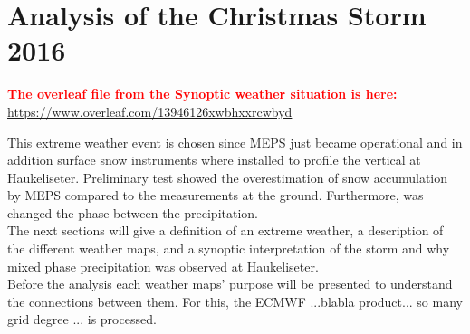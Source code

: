 \chapter{Analysis of the Christmas Storm 2016}
\textcolor{red}{\textbf{The overleaf file from the Synoptic weather situation is here:} \\
	\url{https://www.overleaf.com/13946126xwbhxxrcwbyd}}

This extreme weather event is chosen since MEPS just became operational and in addition surface snow instruments where installed to profile the vertical at Haukeliseter. Preliminary test showed the overestimation of snow accumulation by MEPS compared to the measurements at the ground. Furthermore, was changed the phase between the precipitation.  
\\
The next sections will give a definition of an extreme weather, a description of the different weather maps, and a synoptic interpretation of the storm and why mixed phase precipitation was observed at Haukeliseter. \\
Before the analysis each weather maps' purpose  will be presented to understand the connections between them. For this, the ECMWF ...blabla product... so many grid degree ...  is processed.
\\



\newpage









\newpage





